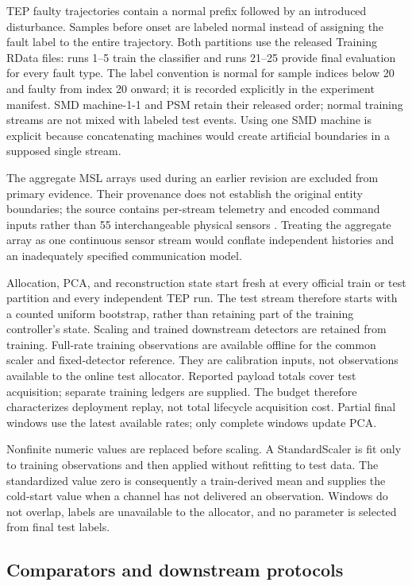 \documentclass[pdflatex,sn-vancouver-num]{sn-jnl}
\theoremstyle{thmstyleone}
\begin{document}
TEP faulty trajectories contain a normal prefix followed by an introduced
disturbance. Samples before onset are labeled normal instead of assigning the
fault label to the entire trajectory. Both partitions use the released Training RData files: runs 1--5 train the
classifier and runs 21--25 provide final evaluation for every fault type.
The label convention is normal for sample indices below 20 and faulty from
index 20 onward; it is recorded explicitly in the experiment manifest. SMD machine-1-1 and
PSM retain their released order; normal training streams are not mixed with
labeled test events. Using one SMD machine is explicit because concatenating
machines would create artificial boundaries in a supposed single stream.

The aggregate MSL arrays used during an earlier revision are excluded from
primary evidence. Their provenance does not establish the original entity
boundaries; the source contains per-stream telemetry and encoded command inputs
rather than 55 interchangeable physical sensors \cite{telemanomdata}.
Treating the aggregate array as one continuous sensor stream would conflate
independent histories and an inadequately specified communication model.

Allocation, PCA, and reconstruction state start fresh at every official train
or test partition and every independent TEP run. The test stream therefore
starts with a counted uniform bootstrap, rather than retaining part of the
training controller's state. Scaling and trained downstream detectors are
retained from training. Full-rate training observations are available offline
for the common scaler and fixed-detector reference. They are calibration inputs,
not observations available to the online test allocator. Reported payload totals
cover test acquisition; separate training ledgers are supplied. The budget
therefore characterizes deployment replay, not total lifecycle acquisition cost. Partial final windows use the latest available rates;
only complete windows update PCA.

Nonfinite numeric values are replaced before scaling. A StandardScaler is fit
only to training observations and then applied without refitting to test data.
The standardized value zero is consequently a train-derived mean and supplies
the cold-start value when a channel has not delivered an observation. Windows
do not overlap, labels are unavailable to the allocator, and no parameter is
selected from final test labels.

\subsection{Comparators and downstream protocols}
\end{document}
